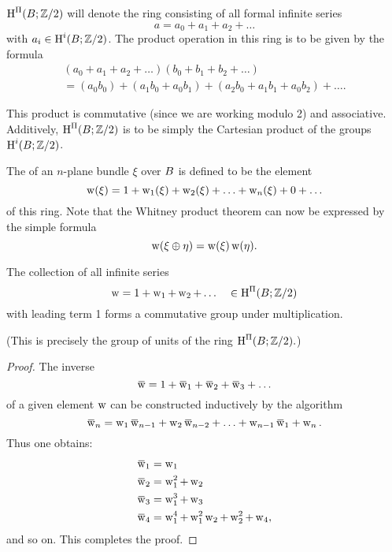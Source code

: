\documentclass[../main]{subfiles}
\begin{document}
\begin{definition}
$\operatorname{H}^{\Pi}(B;\mathbb{Z}/2)$\index{$\homology^\Pi$} will denote the ring consisting of all formal infinite series
\[
a=a_{0}+a_{1}+a_{2}+\ldots
\]
with $a_i \in \operatorname{H}^{i}(B; \mathbb{Z}/2)$. The product operation in this ring is to be given by the formula
\begin{align*}
(a_{0}+a_{1}+a_{2}+\ldots)(b_{0}+b_{1}+b_{2}+\ldots) \\
=(a_{0} b_{0})+ (a_{1} b_{0}+a_{0} b_{1})+(a_{2} b_{0}+a_{1} b_{1}+a_{0} b_{2})+\ldots.
\end{align*}

This product is commutative (since we are working modulo 2) and associative. Additively, $\operatorname{H}^\Pi(B;\mathbb{Z} / 2)$ is to be simply the Cartesian product of the groups $\operatorname{H}^i(B; \mathbb{Z} / 2)$.
\end{definition}

The  of an $n$-plane bundle $\xi$ over $B$ is defined to be the element
\[
\operatorname{w}(\xi)=1+\operatorname{w}_1(\xi)+\operatorname{w}_2(\xi)+\ldots+\operatorname{w}_n(\xi)+0+\ldots
\]
of this ring. Note that the Whitney product theorem can now be expressed by the simple formula
\[
\operatorname{w}(\xi \oplus \eta)=\operatorname{w}(\xi) \operatorname{w}(\eta) .
\]
\begin{lemma}
\label{lem:04.01}
The collection of all infinite series
\[
\operatorname{w}=1+\operatorname{w}_{1}+\operatorname{w}_{2}+\ldots \quad \in \operatorname{H}^{\Pi}(B; \mathbb{Z} / 2)
\]
with leading term 1 forms a commutative group under multiplication.
\end{lemma}

(This is precisely the group of units of the ring $\operatorname{H}^{\Pi}(B; \mathbb{Z} / 2) .$)

\begin{proof}
The inverse
\[
\xoverline{\sw}=1+\xoverline{\sw}_{1}+\xoverline{\sw}_{2}+\xoverline{\sw}_{3}+\ldots
\]
of a given element $\operatorname{w}$ can be constructed inductively by the algorithm
\[
\xoverline{\sw}_{n}=\sw_{1} \xoverline{\sw}_{n-1}+\sw_{2} \xoverline{\sw}_{n-2}+\ldots+\sw_{n-1} \xoverline{\sw}_{1}+\sw_{n} .
\]
Thus one obtains:
\begin{align*}
\xoverline{\sw}_{1}&=\sw_{1} \\
\xoverline{\sw}_{2}&=\sw_{1}^{2}+\sw_{2} \\
\xoverline{\sw}_{3}&=\sw_{1}^{3}+\sw_{3} \\
\xoverline{\sw}_{4}&=\sw_{1}^{4}+\sw_{1}^{2}\sw_{2}+\sw_{2}^{2}+\sw_{4},
\end{align*}
and so on. This completes the proof.
\end{proof}
\end{document}
